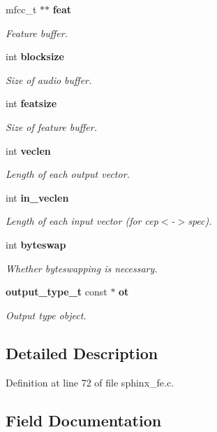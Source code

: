 \begin{DoxyCompactItemize}
mfcc\+\_\+t $\ast$$\ast$ {\bf feat}
\begin{DoxyCompactList}\small\item\em Feature buffer. \end{DoxyCompactList}\item 
int {\bf blocksize}
\begin{DoxyCompactList}\small\item\em Size of audio buffer. \end{DoxyCompactList}\item 
int {\bf featsize}
\begin{DoxyCompactList}\small\item\em Size of feature buffer. \end{DoxyCompactList}\item 
int {\bf veclen}
\begin{DoxyCompactList}\small\item\em Length of each output vector. \end{DoxyCompactList}\item 
int {\bf in\+\_\+veclen}
\begin{DoxyCompactList}\small\item\em Length of each input vector (for cep$<$-\/$>$spec). \end{DoxyCompactList}\item 
int {\bf byteswap}
\begin{DoxyCompactList}\small\item\em Whether byteswapping is necessary. \end{DoxyCompactList}\item 
{\bf output\+\_\+type\+\_\+t} const $\ast$ {\bf ot}
\begin{DoxyCompactList}\small\item\em Output type object. \end{DoxyCompactList}\end{DoxyCompactItemize}


\subsection{Detailed Description}


Definition at line 72 of file sphinx\+\_\+fe.\+c.



\subsection{Field Documentation}
